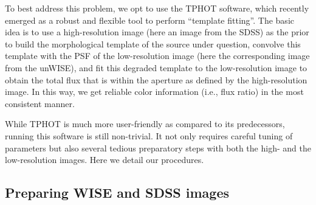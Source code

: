 \documentclass[numberedappendix,apj,twocolumn]{emulateapj}
\begin{document}
To best address this problem, we opt to use the TPHOT software, which recently emerged as a robust and flexible tool to perform ``template fitting''. The basic idea is to use a high-resolution image (here an image from the SDSS) as the prior to build the morphological template of the source under question, convolve this template with the PSF of the low-resolution image (here the corresponding image from the unWISE), and fit this degraded template to the low-resolution image to obtain the total flux that is within the aperture as defined by the high-resolution image. In this way, we get reliable color information (i.e., flux ratio) in the most consistent manner. 

While TPHOT is much more user-friendly as compared to its predecessors, running this software is still non-trivial. It not only requires careful tuning of parameters but also several tedious preparatory steps with both the high- and the low-resolution images. Here we detail our procedures.
	

\subsection{Preparing WISE and SDSS images} 

\end{document}
